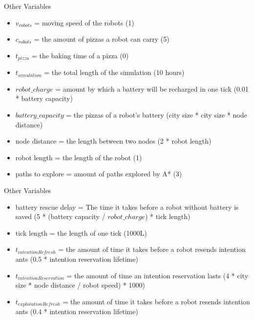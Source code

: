 \begin{frame}{Other Variables}
    \begin{itemize}
        \item $v_{robots}$ = moving speed of the robots (1)
        \item $c_{robots}$ = the amount of pizzas a robot can carry (5)
        \item $t_{pizza}$ = the baking time of a pizza (0)
        \item $t_{simulation}$ = the total length of the simulation (10 hours)
        \item ${robot\_charge}$ = amount by which a battery will be recharged in one tick (0.01 * battery capacity)
        \item $battery\_capacity$ = the pizzas of a robot's battery (city size * city size * node distance)
        \item node distance = the length between two nodes (2 * robot length)
        \item robot length = the length of the robot (1)
        \item paths to explore = amount of paths explored by A* (3)
    \end{itemize}
\end{frame}

\begin{frame}{Other Variables}
    \begin{itemize}
        \item battery rescue delay = The time it takes before a robot without battery is saved (5 * (battery capacity / ${robot\_charge}$) * tick length)
        \item tick length = the length of one tick (1000L)
        \item $t_{intentionRefresh}$ = the amount of time it takes before a robot resends intention ants (0.5 * intention reservation lifetime)
        \item $t_{intentionReservation}$ = the amount of time an intention reservation lasts (4 * city size * node distance / robot speed) * 1000)
        \item $t_{explorationRefresh}$ =  the amount of time it takes before a robot resends intention ants (0.4 * intention reservation lifetime)
    \end{itemize}
\end{frame}

